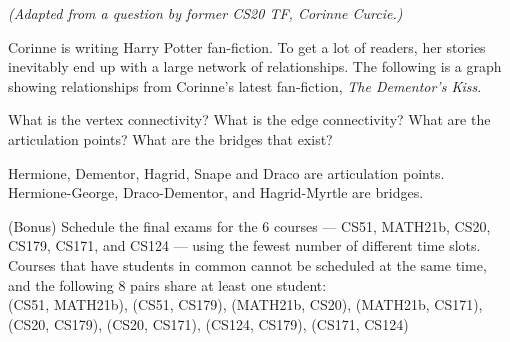 \documentclass[solution, letterpaper]{cs20inclass}
\begin{document}
\problem 
\textit{(Adapted from a question by former CS20 TF, Corinne Curcie.)}

\noindent Corinne is writing Harry Potter fan-fiction. To get a lot of readers, her stories inevitably end up with a large network of relationships. The following is a graph showing relationships from Corinne's latest fan-fiction, \emph{The Dementor's Kiss}. 

\medskip


\subproblem What is the vertex connectivity?
\subproblem What is the edge connectivity?
\subproblem What are the articulation points?
\subproblem What are the bridges that exist?

\begin{solution}
\subsolution Hermione, Dementor, Hagrid, Snape and Draco are articulation points. 
\subsolution Hermione-George, Draco-Dementor, and Hagrid-Myrtle are bridges.
\end{solution}

\problem
(Bonus) Schedule the final exams for the 6 courses --- CS51, MATH21b, CS20, CS179, CS171, and CS124 --- using the fewest number of different time slots. Courses that have students in common cannot be scheduled at the same time, and the following 8 pairs share at least one student: \\

\noindent (CS51, MATH21b), (CS51, CS179), (MATH21b, CS20), (MATH21b, CS171), (CS20, CS179), (CS20, CS171), (CS124, CS179), (CS171, CS124)
\end{document}

